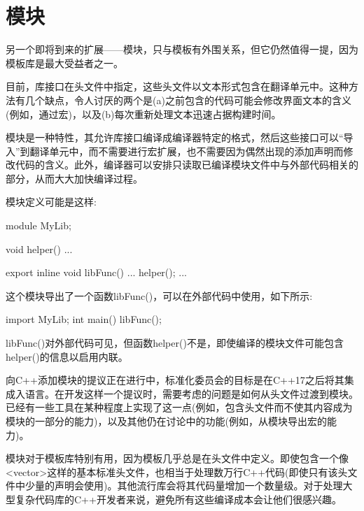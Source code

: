 \section{模块}
另一个即将到来的扩展——模块，只与模板有外围关系，但它仍然值得一提，因为模板库是最大受益者之一。

目前，库接口在头文件中指定，这些头文件以文本形式包含在翻译单元中。这种方法有几个缺点，令人讨厌的两个是(a)之前包含的代码可能会修改界面文本的含义(例如，通过宏)，以及(b)每次重新处理文本迅速占据构建时间。

模块是一种特性，其允许库接口编译成编译器特定的格式，然后这些接口可以“导入”到翻译单元中，而不需要进行宏扩展，也不需要因为偶然出现的添加声明而修改代码的含义。此外，编译器可以安排只读取已编译模块文件中与外部代码相关的部分，从而大大加快编译过程。

模块定义可能是这样:

\begin{cpp}
module MyLib;

void helper() {
	...
}

export inline void libFunc() {
	...
	helper();
	...
}
\end{cpp}

这个模块导出了一个函数libFunc()，可以在外部代码中使用，如下所示:

\begin{cpp}
import MyLib;
int main() {
	libFunc();
}
\end{cpp}

libFunc()对外部代码可见，但函数helper()不是，即使编译的模块文件可能包含helper()的信息以启用内联。

向C++添加模块的提议正在进行中，标准化委员会的目标是在C++17之后将其集成入语言。在开发这样一个提议时，需要考虑的问题是如何从头文件过渡到模块。已经有一些工具在某种程度上实现了这一点(例如，包含头文件而不使其内容成为模块的一部分的能力)，以及其他仍在讨论中的功能(例如，从模块导出宏的能力)。

模块对于模板库特别有用，因为模板几乎总是在头文件中定义。即使包含一个像<vector>这样的基本标准头文件，也相当于处理数万行C++代码(即使只有该头文件中少量的声明会使用)。其他流行库会将其代码量增加一个数量级。对于处理大型复杂代码库的C++开发者来说，避免所有这些编译成本会让他们很感兴趣。
































